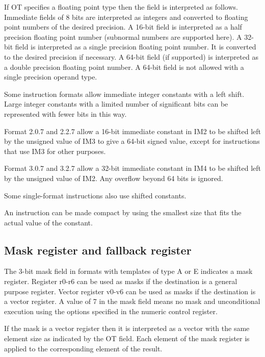 \documentclass[forwardcom.tex]{subfiles}
\begin{document}
If OT specifies a floating point type then the field is interpreted as follows. Immediate fields of 8 bits are interpreted as integers and converted to floating point numbers of the desired precision. A 16-bit field is interpreted as a half precision floating point number (subnormal numbers are supported here). A 32-bit field is interpreted as a single precision floating point number. It is converted to the desired precision if necessary. A 64-bit field (if supported) is interpreted as a double precision floating point number. A 64-bit field is not allowed with a single precision operand type.
\vspace{2mm}

Some instruction formats allow immediate integer constants with a left shift. Large integer constants with a limited number of significant bits can be represented with fewer bits in this way.

Format 2.0.7 and 2.2.7 allow a 16-bit immediate constant in IM2 to be shifted left by the unsigned value of IM3 to give a 64-bit signed value, except for instructions that use IM3 for other purposes.

Format 3.0.7 and 3.2.7 allow a 32-bit immediate constant in IM4 to be shifted left by the unsigned value of IM2.
Any overflow beyond 64 bits is ignored.

Some single-format instructions also use shifted constants.
\vspace{2mm}

An instruction can be made compact by using the smallest size that fits the actual value of the constant.


\subsection{Mask register and fallback register}
The 3-bit mask field in formats with templates of type A or E indicates a mask register. Register r0-r6 can be used as masks if the destination is a general purpose register. Vector register v0-v6 can be used as masks if the destination is a vector register. A value of 7 in the mask field means no mask and unconditional execution using the options specified in the numeric control register.
\vspace{2mm}

If the mask is a vector register then it is interpreted as a vector with the same element size as indicated by the OT field. Each element of the mask register is applied to the corresponding element of the result.
\vspace{2mm}
\end{document}
